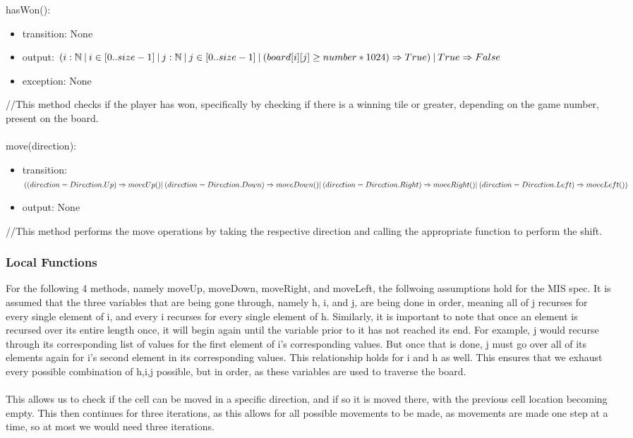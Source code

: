 \documentclass[12pt]{article}
\begin{document}
\noindent hasWon():
\begin{itemize}
  \item transition: None
  \item output: $(i : \mathbb{N} \: | \: i \in [0..size-1] \: |\:j : \mathbb{N} \: | \: j \in [0..size-1] \: |\\ \:(board[i][j] \ge number*1024) \Rightarrow True) \:| \: True \Rightarrow False$
  \item exception: None
\end{itemize}
//This method checks if the player has won, specifically by checking if there is a winning tile or greater, depending on the game number, present on the board.\\\\
\noindent move(direction):
\begin{itemize}
\item transition: $((direction = Direction.Up) \Rightarrow moveUp() \:\\
| \: (direction = Direction.Down) \Rightarrow moveDown() \\
| \: (direction = Direction.Right) \Rightarrow moveRight() \\
| \: (direction = Direction.Left) \Rightarrow moveLeft())$
\item output: None
  \medskip
\end{itemize}
//This method performs the move operations by taking the respective direction and calling the appropriate function to perform the shift.

\newpage

\subsubsection* {Local Functions}

For the following 4 methods, namely moveUp, moveDown, moveRight, and moveLeft, the follwoing assumptions hold for the MIS spec. It is assumed that the three variables that are being gone through, namely h, i, and j, are being done in order, meaning all of j recurses for every single element of i, and every i recurses for every single element of h. Similarly, it is important to note that once an element is recursed over its entire length once, it will begin again until the variable prior to it has not reached its end. For example, j would recurse through its corresponding list of values for the first element of i's corresponding values. But once that is done, j must go over all of its elements again for i's second element in its corresponding values. This relationship holds for i and h as well. This ensures that we exhaust every possible combination of h,i,j possible, but in order, as these variables are used to traverse the board.\\
\\This allows us to check if the cell can be moved in a specific direction, and if so it is moved there, with the previous cell location becoming empty. This then continues for three iterations, as this allows for all possible movements to be made, as movements are made one step at a time, so at most we would need three iterations.\\
\end{document}
